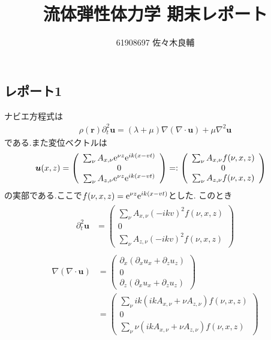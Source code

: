 \documentclass[uplatex,a4j,11pt,dvipdfmx]{jsarticle}
\begin{document}
\title{流体弾性体力学 期末レポート}
\author{61908697 佐々木良輔}
\date{}
\maketitle
\subsection*{レポート1}
ナビエ方程式は
\begin{align}
  \rho({\bm r})\partial_t^2{\bm u}=(\lambda+\mu)\nabla(\nabla\cdot{\bm u})+\mu\nabla^2{\bm u}
\end{align}
である.また変位ベクトルは
\begin{align}
  {\bm u}(x,z)=\left(
    \begin{array}{c}
      \sum_\nu A_{x,\nu}{\rm e}^{\nu z}{\rm e}^{ik(x-vt)}\\
      0\\
      \sum_\nu A_{z,\nu}{\rm e}^{\nu z}{\rm e}^{ik(x-vt)}
    \end{array}
  \right)
  &=:\left(
    \begin{array}{c}
      \sum_\nu A_{x,\nu}f(\nu,x,z)\\
      0\\
      \sum_\nu A_{z,\nu}f(\nu,x,z)
    \end{array}
  \right)
\end{align}
の実部である.ここで$f(\nu,x,z)={\rm e}^{\nu z}{\rm e}^{ik(x-vt)}$とした.
このとき
\begin{align}
  \begin{split}
    \partial_t^2{\bm u}&=\left(
      \begin{array}{c}
        \sum_\nu A_{x,\nu}(-ikv)^2f(\nu,x,z)\\
        0\\
        \sum_\nu A_{z,\nu}(-ikv)^2f(\nu,x,z)
      \end{array}
    \right)
  \end{split}
\end{align}
\begin{align}
  \begin{split}
    \nabla(\nabla\cdot{\bm u})&=\left(
      \begin{array}{c}
        \partial_x(\partial_xu_x+\partial_zu_z)\\
        0\\
        \partial_z(\partial_xu_x+\partial_zu_z)
      \end{array}
    \right)\\
    &=\left(
      \begin{array}{c}
        \sum_\nu ik(ikA_{x,\nu}+\nu A_{z,\nu})f(\nu,x,z)\\
        0\\
        \sum_\nu \nu(ikA_{x,\nu}+\nu A_{z,\nu})f(\nu,x,z)
      \end{array}
    \right)
  \end{split}
\end{align}
\end{document}
